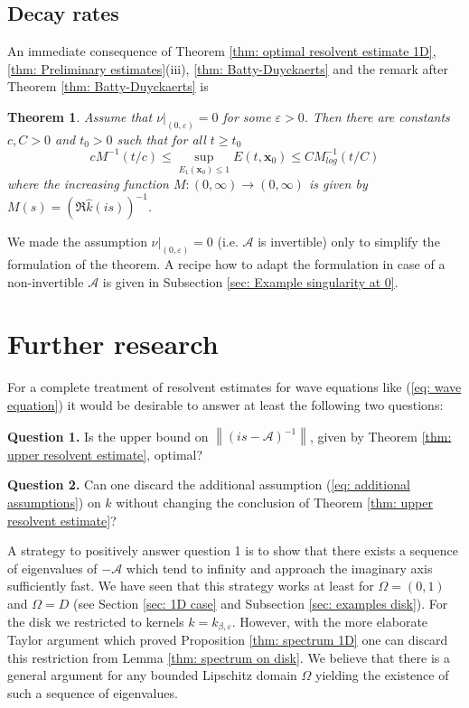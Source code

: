 \documentclass{amsart}
\newcommand{\norm}[1]{\left\| #1 \right\|}
\newcommand{\A}{\mathcal{A}}
\newcommand{\xnice}{\mathbf{x}}
\newcommand{\khat}{\hat{k}}
\newtheorem{Theorem}{Theorem}
\begin{document}
\subsection{Decay rates}\label{sec: Decay rates}
An immediate consequence of Theorem \ref{thm: optimal resolvent estimate 1D}, \ref{thm: Preliminary estimates}(iii), \ref{thm: Batty-Duyckaerts} and the remark after Theorem \ref{thm: Batty-Duyckaerts} is
\begin{Theorem}\label{thm: Decay rate 1D}
 Assume that $\nu|_{(0,\varepsilon)}=0$ for some $\varepsilon>0$. Then there are constants $c,C>0$ and $t_0>0$ such that for all $t\geq t_0$
 \begin{equation}\nonumber
  c M^{-1}(t/c) \leq \sup_{E_1(\xnice_0)\leq 1} E(t, \xnice_0) \leq C M_{log}^{-1}(t/C)
 \end{equation}
 where the increasing function $M:(0,\infty)\rightarrow(0,\infty)$ is given by $M(s)=(\Re\khat(is))^{-1}$.
\end{Theorem}
We made the assumption $\nu|_{(0,\varepsilon)}=0$ (i.e. $\A$ is invertible) only to simplify the formulation of the theorem. A recipe how to adapt the formulation in case of a non-invertible $\A$ is given in Subsection \ref{sec: Example singularity at 0}.


\section{Further research}\label{sec: Conclusion}
For a complete treatment of resolvent estimates for wave equations like (\ref{eq: wave equation}) it would be desirable to answer at least the following two questions:

\textbf{Question 1.} Is the upper bound on $\norm{(is-\A)^{-1}}$, given by Theorem \ref{thm: upper resolvent estimate}, optimal? 

\textbf{Question 2.} Can one discard the additional assumption (\ref{eq: additional assumptions}) on $\khat$ without changing the conclusion of Theorem \ref{thm: upper resolvent estimate}?

A strategy to positively answer question 1 is to show that there exists a sequence of eigenvalues of $-\A$ which tend to infinity and approach the imaginary axis sufficiently fast. We have seen that this strategy works at least for $\Omega=(0,1)$ and $\Omega=D$ (see Section \ref{sec: 1D case} and Subsection \ref{sec: examples disk}). For the disk we restricted to kernels $k=k_{\beta,\varepsilon}$. However, with the more elaborate Taylor argument which proved Proposition \ref{thm: spectrum 1D} one can discard this restriction from Lemma \ref{thm: spectrum on disk}. We believe that there is a general argument for any bounded Lipschitz domain $\Omega$ yielding the existence of such a sequence of eigenvalues.
\end{document}
